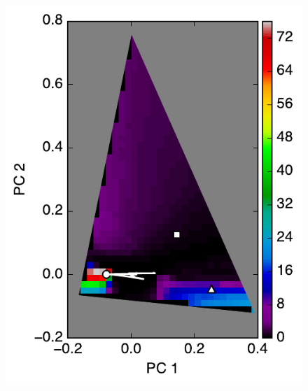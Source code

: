 \documentclass[iop,numberedappendix,apj,]{emulateapj}
\begin{document}
\begin{figure}[tbh!]
    \begin{center}
\includegraphics[width=\hsize]{mockdata_90deg_3types_t12_lc_reg_l30deg.pdf}

\end{center}
\end{figure}
\end{document}
